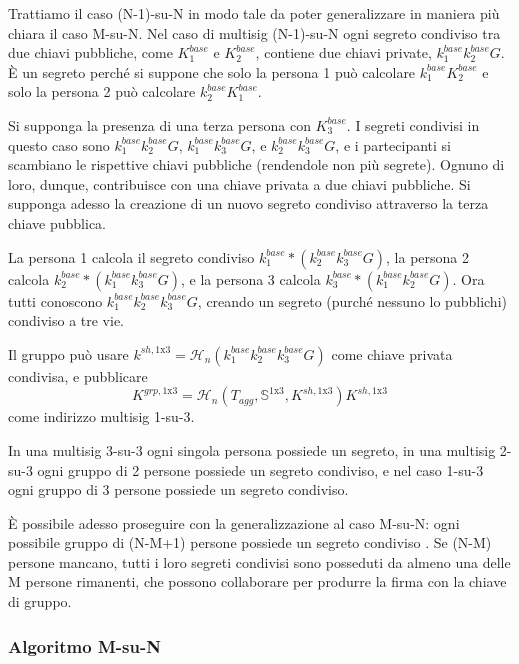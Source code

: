 Trattiamo il caso (N-1)-su-N in modo tale da poter generalizzare in maniera più chiara il caso M-su-N. Nel caso di multisig (N-1)-su-N ogni segreto condiviso tra due chiavi pubbliche, come $K^{base}_1$ e $K^{base}_2$, contiene due chiavi private, $k^{base}_1 k^{base}_2 G$. È un segreto perché si suppone che solo la persona 1 può calcolare $k^{base}_1 K^{base}_2$ e solo la persona 2 può calcolare $k^{base}_2 K^{base}_1$.

Si supponga la presenza di una terza persona con $K^{base}_3$. I segreti condivisi in questo caso sono $k^{base}_1 k^{base}_2 G$, $k^{base}_1 k^{base}_3 G$, e $k^{base}_2 k^{base}_3 G$, e i partecipanti si scambiano le rispettive chiavi pubbliche (rendendole non più segrete). Ognuno di loro, dunque, contribuisce con una chiave privata a due chiavi pubbliche. Si supponga adesso la creazione di un nuovo segreto condiviso attraverso la terza chiave pubblica.

La persona 1 calcola il segreto condiviso $k^{base}_1*(k^{base}_2 k^{base}_3 G)$, la persona 2 calcola $k^{base}_2*(k^{base}_1 k^{base}_3 G)$, e la persona 3 calcola $k^{base}_3*(k^{base}_1 k^{base}_2 G)$. Ora tutti conoscono $k^{base}_1 k^{base}_2 k^{base}_3 G$, creando un segreto (purché nessuno lo pubblichi) condiviso a tre vie.

Il gruppo può usare $k^{sh,\textrm{1x3}} = \mathcal{H}_n(k^{base}_1 k^{base}_2 k^{base}_3 G)$ come chiave privata condivisa, e pubblicare\vspace{.155cm} \[K^{grp,\textrm{1x3}} = \mathcal{H}_n(T_{agg},\mathbb{S}^{\textrm{1x3}},K^{sh,\textrm{1x3}}) K^{sh,\textrm{1x3}}\] come indirizzo multisig 1-su-3.

In una multisig 3-su-3 ogni singola persona possiede un segreto, in una multisig 2-su-3 ogni gruppo di 2 persone possiede un segreto condiviso, e nel caso 1-su-3 ogni gruppo di 3 persone possiede un segreto condiviso.

È possibile adesso proseguire con la generalizzazione al caso M-su-N: ogni possibile gruppo di (N-M+1) persone possiede un segreto condiviso \cite{old-multisig-mrl-note}. Se (N-M) persone mancano, tutti i loro segreti condivisi sono posseduti da almeno una delle M persone rimanenti, che possono collaborare per produrre la firma con la chiave di gruppo.

\subsubsection*{Algoritmo M-su-N}

